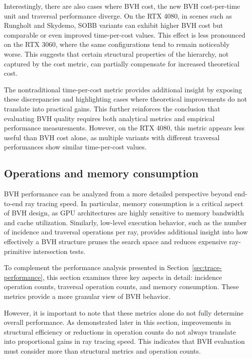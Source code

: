 Interestingly, there are also cases where BVH cost, the new BVH cost-per-time unit and traversal performance diverge. On the RTX 4080, in scenes such as Rungholt and Skydemo, SOBB variants can exhibit higher BVH cost but comparable or even improved time-per-cost values. This effect is less pronounced on the RTX 3060, where the same configurations tend to remain noticeably worse. This suggests that certain structural properties of the hierarchy, not captured by the cost metric, can partially compensate for increased theoretical cost.

The nontraditional time-per-cost metric provides additional insight by exposing these discrepancies and highlighting cases where theoretical improvements do not translate into practical gains. This further reinforces the conclusion that evaluating BVH quality requires both analytical metrics and empirical performance measurements. However, on the RTX 4080, this metric appears less useful than BVH cost alone, as multiple variants with different traversal performances show similar time-per-cost values.

\subsection{Operations and memory consumption}

BVH performance can be analyzed from a more detailed perspective beyond end-to-end ray tracing speed. 
In particular, memory consumption is a critical aspect of BVH design, as GPU architectures are highly sensitive to memory bandwidth and cache utilization. Similarly, low-level execution behavior, such as the number of incidence and traversal operations per ray, provides additional insight into how effectively a BVH structure prunes the search space and reduces expensive ray-primitive intersection tests.

To complement the performance analysis presented in Section~\ref{sec:trace-performance}, this section examines three key aspects in detail: incidence operation counts, traversal operation counts, and memory consumption. These metrics provide a more granular view of BVH behavior.

However, it is important to note that these metrics alone do not fully determine overall performance. As demonstrated later in this section, improvements in structural efficiency or reductions in operation counts do not always translate into proportional gains in ray tracing speed. This indicates that BVH evaluation must consider more than structural metrics and operation counts.

